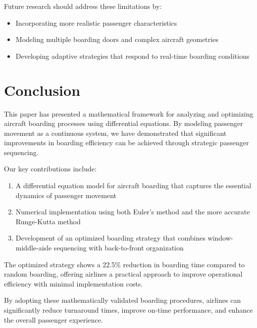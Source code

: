 \documentclass[a4paper,12pt]{article}
\begin{document}
Future research should address these limitations by:
\begin{itemize}
    \item Incorporating more realistic passenger characteristics
    \item Modeling multiple boarding doors and complex aircraft geometries
    \item Developing adaptive strategies that respond to real-time boarding conditions
\end{itemize}

\section{Conclusion}

This paper has presented a mathematical framework for analyzing and optimizing aircraft boarding processes using differential equations. By modeling passenger movement as a continuous system, we have demonstrated that significant improvements in boarding efficiency can be achieved through strategic passenger sequencing.

Our key contributions include:
\begin{enumerate}
    \item A differential equation model for aircraft boarding that captures the essential dynamics of passenger movement
    \item Numerical implementation using both Euler's method and the more accurate Runge-Kutta method
    \item Development of an optimized boarding strategy that combines window-middle-aisle sequencing with back-to-front organization
\end{enumerate}

The optimized strategy shows a 22.5\% reduction in boarding time compared to random boarding, offering airlines a practical approach to improve operational efficiency with minimal implementation costs.

By adopting these mathematically validated boarding procedures, airlines can significantly reduce turnaround times, improve on-time performance, and enhance the overall passenger experience.
\end{document}
